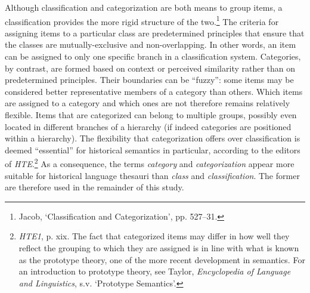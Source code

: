 Although classification and categorization are both means to group items, a classification provides the more rigid structure of the two.\footnote{Jacob, `Classification and Categorization', pp. 527–31.} The criteria for assigning items to a particular class are predetermined principles that ensure that the classes are mutually-exclusive and non-overlapping. In other words, an item can be assigned to only one specific branch in a classification system. Categories, by contrast, are formed based on context or perceived similarity rather than on predetermined principles. Their boundaries can be ``fuzzy'': some items may be considered better representative members of a category than others. Which items are assigned to a category and which ones are not therefore remains relatively flexible. Items that are categorized can belong to multiple groups, possibly even located in different branches of a hierarchy (if indeed categories are positioned within a hierarchy). The flexibility that categorization offers over classification is deemed ``essential'' for historical semantics in particular, according to the editors of \textit{HTE}.\footnote{\textit{HTE1}, p. xix. The fact that categorized items may differ in how well they reflect the grouping to which they are assigned is in line with what is known as the prototype theory, one of the more recent development in semantics. For an introduction to prototype theory, see Taylor, \textit{Encyclopedia of Language and Linguistics}, %
s.v. `Prototype Semantics'.}  As a consequence, the terms \textit{category} and \textit{categorization} appear more suitable for historical language thesauri than \textit{class} and \textit{classification}. The former are therefore used in the remainder of this study.

